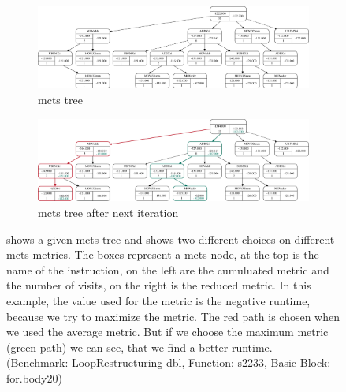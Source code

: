 \begin{figure}[p]
    \centering
    \begin{subfigure}[b]{0.3\textwidth}
        \centering
        \includegraphics[width=18cm,angle=90]{data/mcts-max-vs-avg/svg/selected/8752639012199.pdf}
        \caption{\ac{mcts} tree}
        \label{fig:approach:max-vs-avg:a}
    \end{subfigure}
    \hspace{0.2\textwidth}
    \begin{subfigure}[b]{0.3\textwidth}
        \centering
        \includegraphics[width=18cm,angle=90]{data/mcts-max-vs-avg/svg/selected/8752639012199-next.pdf}
        \caption{\ac{mcts} tree after next iteration}
        \label{fig:approach:max-vs-avg:b}
    \end{subfigure}
    \caption[\ac{mcts} tree with the consequences of maximum and average metric]{
         shows a given \ac{mcts} tree and  shows two different choices on different \ac{mcts} metrics.
        The boxes represent a \ac{mcts} node, at the top is the name of the instruction, on the left are the cumuluated metric and the number of visits, on the right is the reduced metric.
        In this example, the value used for the metric is the negative runtime, because we try to maximize the metric.
        The red path is chosen when we used the average metric. But if we choose the maximum metric (green path) we can see, that we find a better runtime.\\
        (Benchmark: LoopRestructuring-dbl, Function: s2233, Basic Block: for.body20)
    }
    \label{fig:approach:max-vs-avg}
\end{figure}

